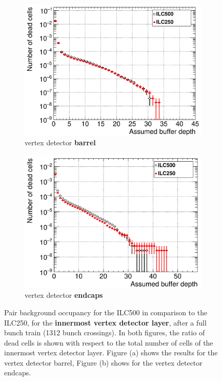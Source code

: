 \begin{figure}
 \centering
  \begin{subfigure}[b]{0.49\textwidth}
   \centering
    \includegraphics[width=\textwidth]{Figures/Pairs/Occupancy_Comparison_Layer_0_deadcells_ILC500vsILC250.png}
   \caption{\sid vertex detector \textbf{barrel}}
   \end{subfigure}
   \hfill
    \begin{subfigure}[b]{0.49\textwidth}
   \centering
    \includegraphics[width=\textwidth]{Figures/Pairs/Occupancy_Comparison_Layer_0_deadcells_ILC500vsILC250_SiVertexEndcap.png}
   \caption{\sid vertex detector \textbf{endcaps}}
   \end{subfigure}
   \caption[Pair background occupancy in the \sid vertex detector for the ILC500 and the ILC250]{Pair background occupancy for the ILC500 in comparison to the ILC250, for the \textbf{innermost \sid vertex detector layer}, after a full bunch train (\num{1312} bunch crossings).
   In both figures, the ratio of dead cells is shown with respect to the total number of cells of the innermost vertex detector layer.
   Figure (a) shows the results for the vertex detector barrel, Figure (b) shows for the vertex detector endcaps.
   }
   \label{fig:PairBkg:ILC500-ILC250_Occupancy}
\end{figure}
